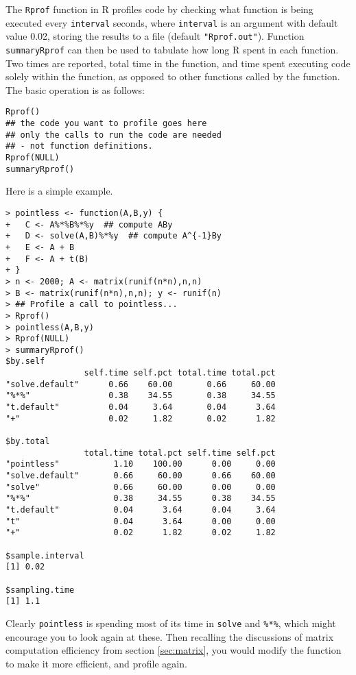 \documentclass[10pt] {article}
\theoremstyle{definition}
\begin{document}
The {\tt Rprof} function in R profiles code by checking what function is being executed every \lstinline+interval+ seconds, where \lstinline+interval+ is an argument with default value 0.02, storing the results to a file (default \lstinline+"Rprof.out"+). Function \lstinline+summaryRprof+ can then be used to tabulate how long R spent in each function. Two times are reported, total time in the function, and time spent executing code solely within the function, as opposed to other functions called by the function. The basic operation is as follows: 
\begin{lstlisting}
Rprof()
## the code you want to profile goes here
## only the calls to run the code are needed 
## - not function definitions.
Rprof(NULL)
summaryRprof()
\end{lstlisting}
Here is a simple example. 
{\small \begin{verbatim}
> pointless <- function(A,B,y) { 
+   C <- A%*%B%*%y  ## compute ABy
+   D <- solve(A,B)%*%y  ## compute A^{-1}By
+   E <- A + B 
+   F <- A + t(B)
+ }
> n <- 2000; A <- matrix(runif(n*n),n,n)
> B <- matrix(runif(n*n),n,n); y <- runif(n)
> ## Profile a call to pointless...
> Rprof()
> pointless(A,B,y)
> Rprof(NULL)
> summaryRprof()
$by.self
                self.time self.pct total.time total.pct
"solve.default"      0.66    60.00       0.66     60.00
"%*%"                0.38    34.55       0.38     34.55
"t.default"          0.04     3.64       0.04      3.64
"+"                  0.02     1.82       0.02      1.82

$by.total
                total.time total.pct self.time self.pct
"pointless"           1.10    100.00      0.00     0.00
"solve.default"       0.66     60.00      0.66    60.00
"solve"               0.66     60.00      0.00     0.00
"%*%"                 0.38     34.55      0.38    34.55
"t.default"           0.04      3.64      0.04     3.64
"t"                   0.04      3.64      0.00     0.00
"+"                   0.02      1.82      0.02     1.82

$sample.interval
[1] 0.02

$sampling.time
[1] 1.1
\end{verbatim}}
Clearly {\tt pointless} is spending most of its time in {\tt solve} and \verb+%*%+, which might encourage you to look again at these. Then recalling the discussions of matrix computation efficiency from section \ref{sec:matrix}, you would modify the function to make it more efficient, and profile again.
\end{document}
